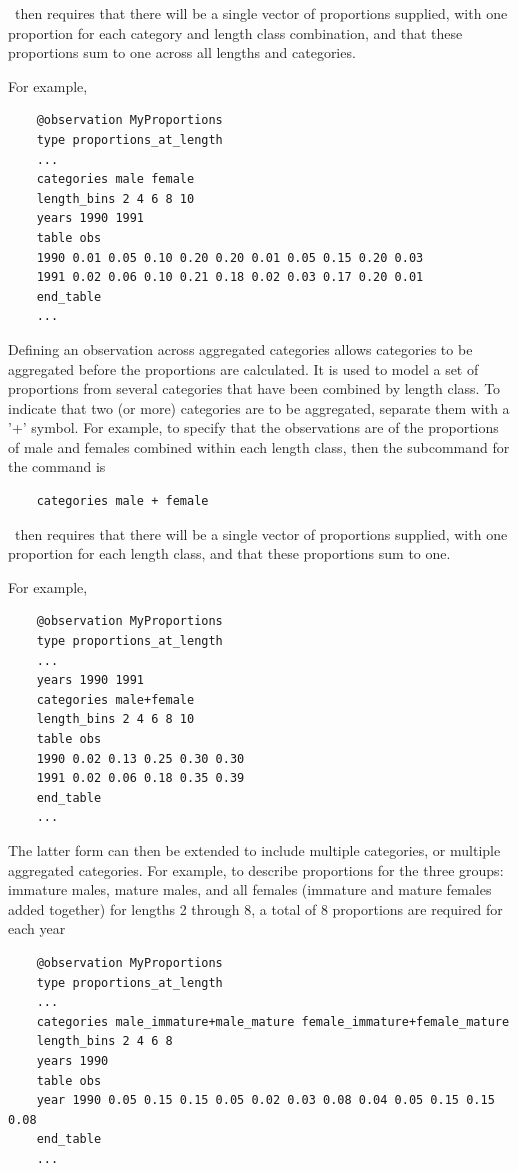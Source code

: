 \CNAME\ then requires that there will be a single vector of proportions supplied, with one proportion for each category and length class combination, and that these proportions sum to one across all lengths and categories.

For example,

{\small{\begin{verbatim}
	@observation MyProportions
	type proportions_at_length
	...
	categories male female
	length_bins 2 4 6 8 10
	years 1990 1991
	table obs
	1990 0.01 0.05 0.10 0.20 0.20 0.01 0.05 0.15 0.20 0.03
	1991 0.02 0.06 0.10 0.21 0.18 0.02 0.03 0.17 0.20 0.01
	end_table
	...
\end{verbatim}}}

Defining an observation across aggregated categories allows categories to be aggregated before the proportions are calculated. It is used to model a set of proportions from several categories that have been combined by length class. To indicate that two (or more) categories are to be aggregated, separate them with a '+' symbol. For example, to specify that the observations are of the proportions of male and females combined within each length class, then the subcommand  for the  command is

{\small{\begin{verbatim}
	categories male + female
\end{verbatim}}}

\CNAME\ then requires that there will be a single vector of proportions supplied, with one proportion for each length class, and that these proportions sum to one.

For example,

{\small{\begin{verbatim}
	@observation MyProportions
	type proportions_at_length
	...
	years 1990 1991
	categories male+female
	length_bins 2 4 6 8 10
	table obs
	1990 0.02 0.13 0.25 0.30 0.30
	1991 0.02 0.06 0.18 0.35 0.39
	end_table
	...
\end{verbatim}}}

The latter form can then be extended to include multiple categories, or multiple aggregated categories. For example, to describe proportions for the three groups: immature males, mature males, and all females (immature and mature females added together) for lengths 2 through 8, a total of 8 proportions are required for each year

{\small{\begin{verbatim}
	@observation MyProportions
	type proportions_at_length
	...
	categories male_immature+male_mature female_immature+female_mature
	length_bins 2 4 6 8
	years 1990
	table obs
	year 1990 0.05 0.15 0.15 0.05 0.02 0.03 0.08 0.04 0.05 0.15 0.15 0.08
	end_table
	...

\end{verbatim}}}

